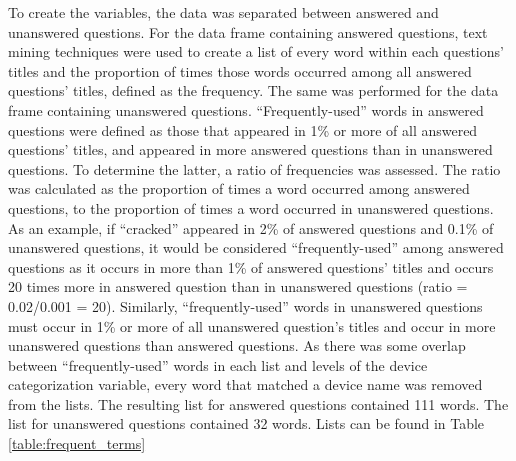 \documentclass{article}
\begin{document}
To create the variables, the data was separated between answered and unanswered questions. For the data frame containing answered questions, text mining techniques were used to create a list of every word within each questions' titles and the proportion of times those words occurred among all answered questions' titles, defined as the frequency. The same was performed for the data frame containing unanswered questions. ``Frequently-used'' words in answered questions were defined as those that appeared in 1\% or more of all answered questions' titles, and appeared in more answered questions than in unanswered questions. To determine the latter, a ratio of frequencies was assessed. The ratio was calculated as the proportion of times a word occurred among answered questions, to the proportion of times a word occurred in unanswered questions. As an example, if ``cracked'' appeared in 2\% of answered questions and 0.1\% of unanswered questions, it would be considered ``frequently-used'' among answered questions as it occurs in more than 1\% of answered questions' titles and occurs 20 times more in answered question than in unanswered questions (ratio = 0.02/0.001 = 20). Similarly, ``frequently-used'' words in unanswered questions must occur in 1\% or more of all unanswered question's titles and occur in more unanswered questions than answered questions. As there was some overlap between ``frequently-used'' words in each list and levels of the device categorization variable, every word that matched a device name was removed from the lists. The resulting list for answered questions contained 111 words. The list for unanswered questions contained 32 words. Lists can be found in Table \ref{table:frequent_terms}
\end{document}
